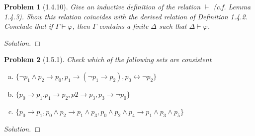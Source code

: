 \documentclass[letter]{article}
\newtheorem{problem}{Problem}
\theoremstyle{definition}
\newenvironment{solution}
{\begin{proof}[Solution]}
        {\end{proof}}
\renewcommand{\phi}{\varphi}
\begin{document}
\begin{problem}[1.4.10] Give an inductive definition of the relation $\vdash$ (c.f. Lemma 1.4.3). Show this relation coincides with the derived relation of Definition 1.4.2. Conclude that if $\Gamma \vdash \phi$, then $\Gamma$ contains a finite $\Delta$ such that $\Delta \vdash \phi$.
\end{problem}
\begin{solution}
\end{solution}


\begin{problem}[1.5.1] Check which of the following sets are consistent
    \begin{enumerate}[(a)]
        \item $\{\neg p_1 \land p_2 \to p_0, p_1 \to (\neg p_1 \to p_2), p_0 \leftrightarrow \neg p_2\}$
        \item $\{p_0 \to p_1. p_1 \to p_2, p2 \to p_3, p_3 \to \neg p_0\}$
        \item $\{p_0 \to p_1, p_0 \land p_2 \to p_1 \land p_3, p_0 \land p_2 \land p_4 \to p_1 \land p_3 \land p_5 \}$
    \end{enumerate}
\end{problem}
\begin{solution}
\end{solution}
\end{document}
